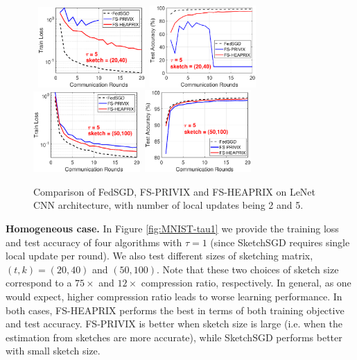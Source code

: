 \begin{figure}[h]
\begin{center}
		\mbox{			    \includegraphics[width=1.6in]{MNIST_figures/local5_sketch20_iid1_train_loss.eps}
		\includegraphics[width=1.6in]{MNIST_figures/local5_sketch20_iid1_test_acc.eps}
		\includegraphics[width=1.6in]{MNIST_figures/local5_sketch50_iid1_train_loss.eps}
		\includegraphics[width=1.6in]{MNIST_figures/local5_sketch50_iid1_test_acc.eps}
		}
	\end{center}
	\caption{Comparison of FedSGD, FS-PRIVIX and FS-HEAPRIX on LeNet CNN architecture, with number of local updates being 2 and 5.}
    \label{fig:MNIST-tau2,tau5}
\end{figure}


\textbf{Homogeneous case.} In Figure \ref{fig:MNIST-tau1} we provide the training loss and test accuracy of four algorithms with $\tau=1$ (since SketchSGD requires single local update per round). We also test different sizes of sketching matrix, $(t,k)=(20,40)$ and $(50,100)$. Note that these two choices of sketch size correspond to a $75\times$ and $12\times$ compression ratio, respectively. In general, as one would expect, higher compression ratio leads to worse learning performance. In both cases, FS-HEAPRIX performs the best in terms of both training objective and test accuracy. FS-PRIVIX is better when sketch size is large (i.e. when the estimation from sketches are more accurate), while SketchSGD performs better with small sketch size. 

